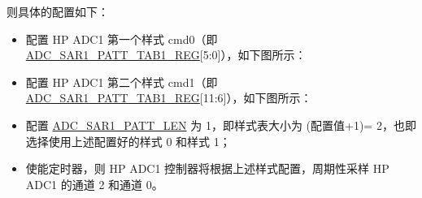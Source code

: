 \documentclass[main\_\_CN.tex]{subfiles}
\begin{document}
则具体的配置如下：
\begin{itemize}
    \item 配置 HP ADC1 第一个样式 cmd0（即 \hyperref[regdesc:ADCSAR1PATTTAB1REG]{ADC\_SAR1\_PATT\_TAB1\_REG}[5:0]），如下图所示：

    \centering
    \reglabel{}\regnewline%
    \begin{regdesc}\end{regdesc}
\end{itemize}

\begin{itemize}

    \item 配置 HP ADC1 第二个样式 cmd1（即 \hyperref[regdesc:ADCSAR1PATTTAB1REG]{ADC\_SAR1\_PATT\_TAB1\_REG}[11:6]），如下图所示：

    \centering
    \reglabel{}\regnewline%
    \begin{regdesc}\end{regdesc}
\end{itemize}

\begin{itemize}
    \item 配置 \hyperref[fielddesc:ADCSAR1PATTLEN]{ADC\_SAR1\_PATT\_LEN} 为 1，即样式表大小为 (配置值+1)= 2，也即选择使用上述配置好的样式 0 和样式 1；
    \item 使能定时器，则 HP ADC1 控制器将根据上述样式配置，周期性采样 HP ADC1 的通道 2 和通道 0。
\end{itemize}
\end{document}
